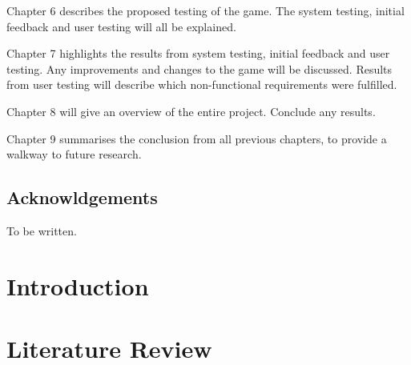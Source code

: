 \documentclass[a4paper,11.5pt]{report}
\makeatletter
\numberwithin{figure}{section}
\numberwithin{table}{section}
\numberwithin{equation}{section}
\numberwithin{equation}{section}
\newcommand\mainmatter{%
    \cleardoublepage
  \pagenumbering{arabic}}
\newcommand\blankpage{%
    \null
    \thispagestyle{empty}%
    \addtocounter{page}{-1}%
    \newpage}
\makeatother
\begin{document}
Chapter 6 describes the proposed testing of the game. The system testing, initial feedback and user testing will all be explained.  

Chapter 7 highlights the results from system testing, initial feedback and user testing. Any improvements and changes to the game will be discussed. Results from user testing will describe which non-functional requirements were fulfilled.

Chapter 8 will give an overview of the entire project. Conclude any results. 

Chapter 9 summarises the conclusion from all previous chapters, to provide a walkway to future research.

\newpage
\hfill
\section*{\Huge{Acknowldgements}}

To be written.
 
\afterpage{\blankpage}

\mainmatter

\chapter{Introduction}



\afterpage{\blankpage}

\chapter{Literature Review}

\end{document}
